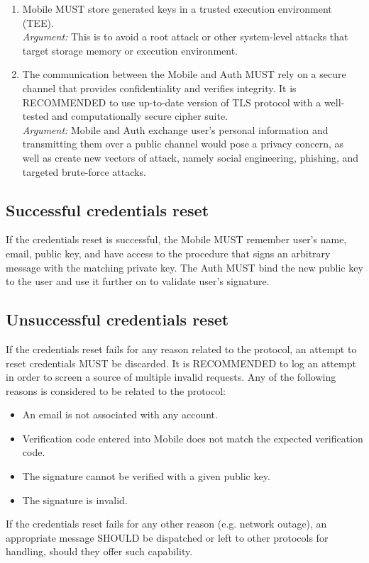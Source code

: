 \begin{enumerate}
            \item Mobile MUST store generated keys in a trusted execution environment (TEE).\\        
            \textit{Argument:} This is to avoid a root attack or other system-level attacks that target storage 
                               memory or execution environment.

            \item The communication between the Mobile and Auth MUST rely on a secure channel that provides 
                  confidentiality and verifies integrity. It is RECOMMENDED to use up-to-date version of 
                  TLS protocol with a well-tested and computationally secure cipher suite.\\      
            \textit{Argument:} Mobile and Auth exchange user's personal information and transmitting them over a 
                               public channel would pose a privacy concern, as well as create new vectors of attack, 
                               namely social engineering, phishing, and targeted brute-force attacks.
    \end{enumerate}

    \subsection{Successful credentials reset}
    If the credentials reset is successful, the Mobile MUST remember user's name, email, public key, and 
    have access to the procedure that signs an arbitrary message with the matching private key. The Auth MUST 
    bind the new public key to the user and use it further on to validate user's signature.

    \subsection{Unsuccessful credentials reset}
    If the credentials reset fails for any reason related to the protocol, an attempt to reset credentials MUST 
    be discarded. It is RECOMMENDED to log an attempt in order to screen a source of multiple invalid requests. 
    Any of the following reasons is considered to be related to the protocol:
        \begin{itemize}
            \item An email is not associated with any account.
            \item Verification code entered into Mobile does not match the expected verification code.
            \item The signature cannot be verified with a given public key.
            \item The signature is invalid.
        \end{itemize}
    If the credentials reset fails for any other reason (e.g. network outage), an appropriate message SHOULD be 
    dispatched or left to other protocols for handling, should they offer such capability.
